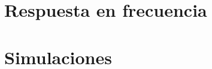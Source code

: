 \section{Respuesta en frecuencia}
\resetallcounters

\cleardoublepage

\section{Simulaciones}
\resetallcounters

\cleardoublepage

